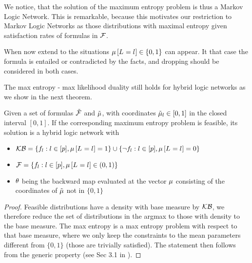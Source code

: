 We notice, that the solution of the maximum entropy problem is thus a Markov Logic Network.
This is remarkable, because this motivates our restriction to Markov Logic Networks as those distributions with maximal entropy given satisfaction rates of formulas in $\mathcal{F}$.


When now extend to the situations $\mu\left[L_{}=l_{}\right]\in\{0,1\}$ can appear.
It that case the formula is entailed or contradicted by the facts, and dropping should be considered in both cases.

The max entropy - max likelihood duality still holds for hybrid logic networks as we show in the next theorem.

\begin{theorem}
    Given a set of formulas $\tilde{\mathcal{F}}$ and $\tilde{\mu}$, with coordinates $\tilde{\mu}_l\in[0,1]$ in the closed interval $[0,1]$.
    If the corresponding maximum entropy problem is feasible, its solution is a hybrid logic network with
    \begin{itemize}
        \item $\mathcal{KB}= \{f_{l} : l\in[p], \mu\left[L_{}=l_{}\right] = 1\} \cup \{\lnot f_{l} : l\in[p], \mu\left[L_{}=l_{}\right] = 0\} $
        \item $\mathcal{F} = \{f_{l} : l\in[p], \mu\left[L_{}=l_{}\right] \in (0,1)\}$
        \item $\theta$ being the backward map evaluated at the vector $\mu$ consisting of the coordinates of $\tilde{\mu}$ not in $\{0,1\}$
    \end{itemize}
\end{theorem}
\begin{proof}
    Feasible distributions have a density with base measure by $\mathcal{KB}$, we therefore reduce the set of distributions in the argmax to those with density to the base measure.
    The max entropy is a max entropy problem with respect to that base measure, where we only keep the constraints to the mean parameters different from $\{0,1\}$ (those are trivially satisfied).
    The statement then follows from the generic property (see Sec 3.1 in \cite{wainwright_graphical_2008}).
\end{proof}






\label{sec:alternatingParEstMLN}

